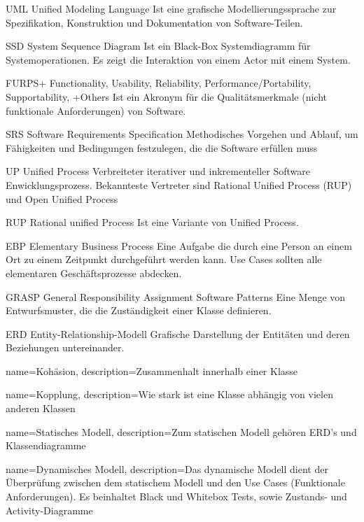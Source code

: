 {UML}
{Unified Modeling Language}
{
	Ist eine grafische Modellierungssprache zur Spezifikation, Konstruktion und Dokumentation von Software-Teilen.
}

{SSD}
{System Sequence Diagram}
{
	Ist ein Black-Box Systemdiagramm für Systemoperationen. Es zeigt die Interaktion von einem Actor mit einem System.
}

{FURPS+}
{Functionality, Usability, Reliability, Performance/Portability, Supportability, +Others}
{
	Ist ein Akronym für die Qualitätsmerkmale (nicht funktionale Anforderungen) von Software. 
}

{SRS}
{Software Requirements Specification}
{
	Methodisches Vorgehen und Ablauf, um Fähigkeiten und Bedingungen festzulegen, die die Software erfüllen muss
}

{UP}
{Unified Process}
{
	Verbreiteter iterativer und inkrementeller Software Enwicklungsprozess. Bekannteste Vertreter sind Rational Unified Process (RUP) und Open Unified Process
}

{RUP}
{Rational unified Process}
{
	Ist eine Variante von Unified Process.
}

{EBP}
{Elementary Business Process}
{
	Eine Aufgabe die durch eine Person an einem Ort zu einem Zeitpunkt durchgeführt werden kann. Use Cases sollten alle elementaren Geschäftsprozesse abdecken.
}

{GRASP}
{General Responsibility Assignment Software Patterns}
{
	Eine Menge von Entwurfsmuster, die die Zuständigkeit einer Klasse definieren.
}

{ERD}
{Entity-Relationship-Modell}
{
	Grafische Darstellung der Entitäten und deren Beziehungen untereinander.
}


{
	name={Kohäsion},
	description={Zusammenhalt innerhalb einer Klasse}
}

{
	name={Kopplung},
	description={Wie stark ist eine Klasse abhängig von vielen anderen Klassen}
}

{
	name={Statisches Modell},
	description={Zum statischen Modell gehören ERD's und Klassendiagramme}
}

{
	name={Dynamisches Modell},
	description={Das dynamische Modell dient der Überprüfung zwischen dem statischem Modell und den Use Cases (Funktionale Anforderungen). Es beinhaltet Black und Whitebox Tests, sowie Zustands- und Activity-Diagramme}
}


